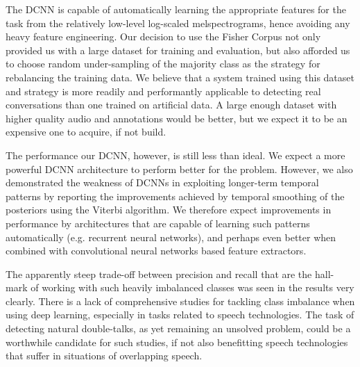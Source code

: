 \documentclass[a4paper]{article}
\begin{document}
The DCNN is capable of automatically learning the appropriate features for the task from the relatively low-level log-scaled melspectrograms, hence avoiding any heavy feature engineering.
Our decision to use the Fisher Corpus not only provided us with a large dataset for training and evaluation,
but also afforded us to choose random under-sampling of the majority class as the strategy for rebalancing the training data.
We believe that a system trained using this dataset and strategy is more readily and performantly applicable to detecting real conversations than one trained on artificial data.
A large enough dataset with higher quality audio and annotations would be better,
but we expect it to be an expensive one to acquire, if not build.

The performance our DCNN, however, is still less than ideal.
We expect a more powerful DCNN architecture to perform better for the problem.
However, we also demonstrated the weakness of DCNNs in exploiting longer-term temporal patterns by reporting the improvements achieved by temporal smoothing of the posteriors using the Viterbi algorithm.
We therefore expect improvements in performance by architectures that are capable of learning such patterns automatically (e.g. recurrent neural networks),
and perhaps even better when combined with convolutional neural networks based feature extractors.

The apparently steep trade-off between precision and recall that are the hall-mark of working with such heavily imbalanced classes was seen in the results very clearly.
There is a lack of comprehensive studies for tackling class imbalance when using deep learning,
especially in tasks related to speech technologies.
The task of detecting natural double-talks, as yet remaining an unsolved problem,
could be a worthwhile candidate for such studies,
if not also benefitting speech technologies that suffer in situations of overlapping speech.



\end{document}
